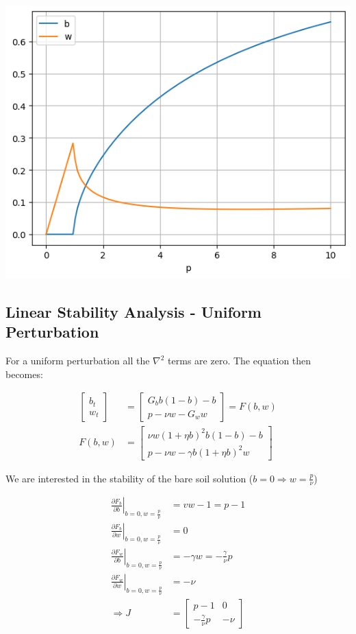 \includegraphics[scale=0.5]{plots/pasted1.png}

\subsection{Linear Stability Analysis - Uniform Perturbation}

For a uniform perturbation all the $\nabla^{2}$ terms are zero. The
equation then becomes:

\begin{align*}
\left[\begin{array}{c}
b_{t}\\
w_{t}
\end{array}\right] & =\left[\begin{array}{c}
G_{b}b\left(1-b\right)-b\\
p-\nu w-G_{w}w
\end{array}\right]=F\left(b,w\right)\\
F\left(b,w\right) & =\left[\begin{array}{c}
\nu w\left(1+\eta b\right)^{2}b\left(1-b\right)-b\\
p-\nu w-\gamma b\left(1+\eta b\right)^{2}w
\end{array}\right]
\end{align*}

We are interested in the stability of the bare soil solution ($b=0\Rightarrow w=\frac{p}{\nu}$)

\begin{align*}
\left.\frac{\partial F_{b}}{\partial b}\right|_{b=0,w=\frac{p}{\nu}} & =vw-1=p-1\\
\left.\frac{\partial F_{b}}{\partial w}\right|_{b=0,w=\frac{p}{\nu}} & =0\\
\left.\frac{\partial F_{w}}{\partial b}\right|_{b=0,w=\frac{p}{\nu}} & =-\gamma w=-\frac{\gamma}{\nu}p\\
\left.\frac{\partial F_{w}}{\partial w}\right|_{b=0,w=\frac{p}{\nu}} & =-\nu\\
\Rightarrow J & =\left[\begin{array}{cc}
p-1 & 0\\
-\frac{\gamma}{\nu}p & -\nu
\end{array}\right]
\end{align*}

